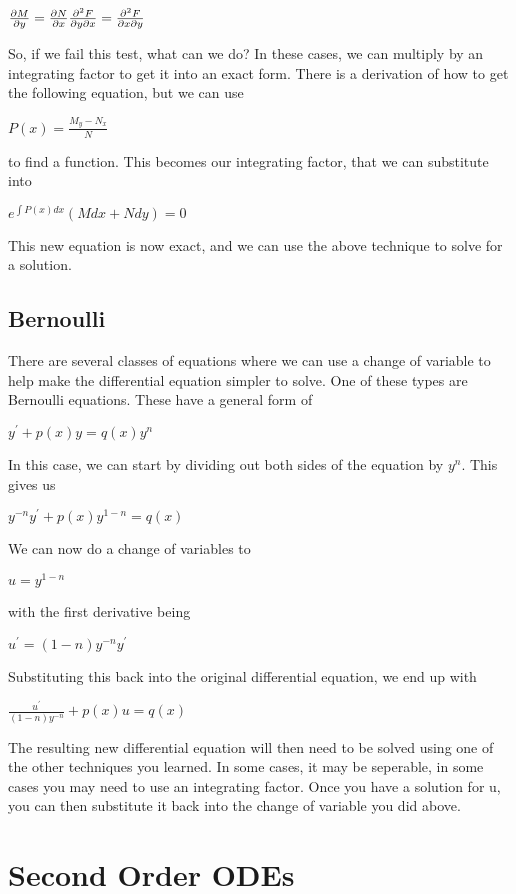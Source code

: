 \documentclass[
  letterpaper,
]{report}
\begin{document}
\(\frac{\partial M}{\partial y} = \frac{\partial N}{\partial x} \\
\frac{\partial^2 F}{\partial y \partial x} = \frac{\partial^2 F}{\partial x \partial y}\)

So, if we fail this test, what can we do? In these cases, we can
multiply by an integrating factor to get it into an exact form. There is
a derivation of how to get the following equation, but we can use

\(P(x) = \frac{M_y - N_x}{N}\)

to find a function. This becomes our integrating factor, that we can
substitute into

\(e^{\int P(x) dx} (M dx + N dy) = 0\)

This new equation is now exact, and we can use the above technique to
solve for a solution.

\section{Bernoulli}\label{bernoulli}

There are several classes of equations where we can use a change of
variable to help make the differential equation simpler to solve. One of
these types are Bernoulli equations. These have a general form of

\(y^{'} + p(x) y = q(x) y^{n}\)

In this case, we can start by dividing out both sides of the equation by
\(y^{n}\). This gives us

\(y^{-n} y^{'} + p(x) y^{1-n} = q(x)\)

We can now do a change of variables to

\(u = y^{1-n}\)

with the first derivative being

\(u^{'} = (1-n) y^{-n} y^{'}\)

Substituting this back into the original differential equation, we end
up with

\(\frac{u^{'}}{(1-n) y^{-n}} + p(x) u = q(x)\)

The resulting new differential equation will then need to be solved
using one of the other techniques you learned. In some cases, it may be
seperable, in some cases you may need to use an integrating factor. Once
you have a solution for u, you can then substitute it back into the
change of variable you did above.


\chapter{Second Order ODEs}\label{second-order-odes}
\end{document}
